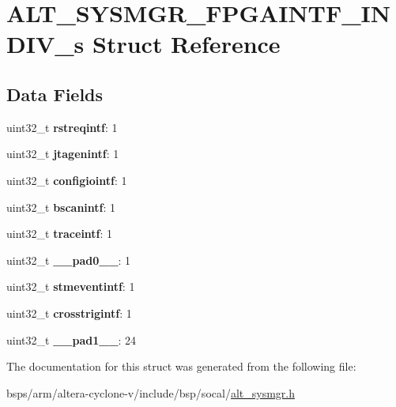 \hypertarget{structALT__SYSMGR__FPGAINTF__INDIV__s}{}\section{A\+L\+T\+\_\+\+S\+Y\+S\+M\+G\+R\+\_\+\+F\+P\+G\+A\+I\+N\+T\+F\+\_\+\+I\+N\+D\+I\+V\+\_\+s Struct Reference}
\label{structALT__SYSMGR__FPGAINTF__INDIV__s}
\subsection*{Data Fields}
\begin{DoxyCompactItemize}
\item 
\mbox{\label{structALT__SYSMGR__FPGAINTF__INDIV__s_a4f598aa7deb11c57cdbb19dd07541887}} 
uint32\+\_\+t {\bfseries rstreqintf}\+: 1
\item 
\mbox{\label{structALT__SYSMGR__FPGAINTF__INDIV__s_ad8a504c131785dbf8d7b66a997b5ad36}} 
uint32\+\_\+t {\bfseries jtagenintf}\+: 1
\item 
\mbox{\label{structALT__SYSMGR__FPGAINTF__INDIV__s_a75a6b922c3df40f436af5532e0e40db5}} 
uint32\+\_\+t {\bfseries configiointf}\+: 1
\item 
\mbox{\label{structALT__SYSMGR__FPGAINTF__INDIV__s_a977932d3c6a3fb47b31ac3034af6b1e1}} 
uint32\+\_\+t {\bfseries bscanintf}\+: 1
\item 
\mbox{\label{structALT__SYSMGR__FPGAINTF__INDIV__s_a0bfb81b7a8177242d67b8a65edb7d533}} 
uint32\+\_\+t {\bfseries traceintf}\+: 1
\item 
\mbox{\label{structALT__SYSMGR__FPGAINTF__INDIV__s_a530a1533146bf4fb6200ae646b97a1af}} 
uint32\+\_\+t {\bfseries \+\_\+\+\_\+pad0\+\_\+\+\_\+}\+: 1
\item 
\mbox{\label{structALT__SYSMGR__FPGAINTF__INDIV__s_a226cfa44ed3385f41f4fa4120b5d6ced}} 
uint32\+\_\+t {\bfseries stmeventintf}\+: 1
\item 
\mbox{\label{structALT__SYSMGR__FPGAINTF__INDIV__s_a4281720ebae2ffce7f07c9e2f57ec2ce}} 
uint32\+\_\+t {\bfseries crosstrigintf}\+: 1
\item 
\mbox{\label{structALT__SYSMGR__FPGAINTF__INDIV__s_a0acd773ae8d65c7644b045097d6b613f}} 
uint32\+\_\+t {\bfseries \+\_\+\+\_\+pad1\+\_\+\+\_\+}\+: 24
\end{DoxyCompactItemize}


The documentation for this struct was generated from the following file\+:\begin{DoxyCompactItemize}
\item 
bsps/arm/altera-\/cyclone-\/v/include/bsp/socal/\mbox{\hyperlink{alt__sysmgr_8h}{alt\+\_\+sysmgr.\+h}}\end{DoxyCompactItemize}
